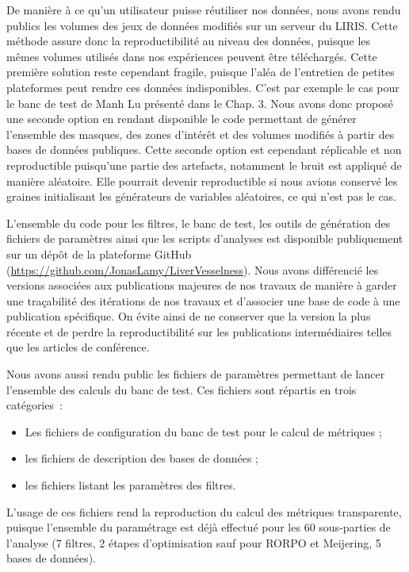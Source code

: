 De manière à ce qu'un utilisateur puisse réutiliser nos données, nous avons rendu publics les volumes des jeux de données modifiés sur un serveur du LIRIS. Cette méthode assure donc la reproductibilité au niveau des données, puisque les mêmes volumes utilisés dans nos expériences peuvent être téléchargés. Cette première solution reste cependant fragile, puisque l'aléa de l'entretien de petites plateformes peut rendre ces données indisponibles. C'est par exemple le cas pour le banc de test de Manh Lu présenté dans le Chap. 3. Nous avons donc proposé une seconde option en rendant disponible le code permettant de générer l'ensemble des masques, des zones d'intérêt et des volumes modifiés à partir des bases de données publiques. Cette seconde option est cependant réplicable et non reproductible puisqu'une partie des artefacts, notamment le bruit est appliqué de manière aléatoire. Elle pourrait devenir reproductible si nous avions conservé les graines initialisant les générateurs de variables aléatoires, ce qui n'est pas le cas.  

L'ensemble du code pour les filtres, le banc de test, les outils de génération des fichiers de paramètres ainsi que les scripts d'analyses est disponible publiquement sur un dépôt de la plateforme GitHub (\url{https://github.com/JonasLamy/LiverVesselness}). Nous avons différencié les versions associées aux publications majeures de nos travaux de manière à garder une traçabilité des itérations de nos travaux et d'associer une base de code à une publication spécifique. On évite ainsi de ne conserver que la version la plus récente et de perdre la reproductibilité sur les publications intermédiaires telles que les articles de conférence.

Nous avons aussi rendu public les fichiers de paramètres permettant de lancer l'ensemble des calculs du banc de test. Ces fichiers sont répartis en trois catégories~: 

\begin{itemize}
\item Les fichiers de configuration du banc de test pour le calcul de métriques ;
\item les fichiers de description des bases de données ;
\item les fichiers listant les paramètres des filtres.  
\end{itemize}

L'usage de ces fichiers rend la reproduction du calcul des métriques transparente, puisque l'ensemble du paramétrage est déjà effectué pour les 60 sous-parties de l'analyse (7 filtres, 2 étapes d'optimisation sauf pour RORPO et Meijering, 5 bases de données).

